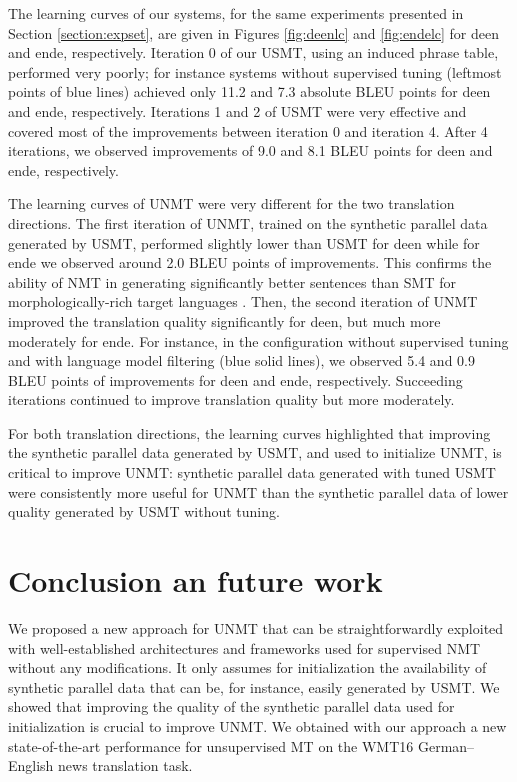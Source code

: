 \documentclass[11pt,a4paper]{article}
\begin{document}
The learning curves of our systems, for the same experiments presented in Section \ref{section:expset}, are given in Figures \ref{fig:deenlc} and \ref{fig:endelc} for deen and ende, respectively.
Iteration 0 of our USMT, using an induced phrase table, performed very poorly; for instance systems without supervised tuning (leftmost points of blue lines) achieved only 11.2 and 7.3 absolute BLEU points for deen and ende, respectively.  Iterations 1 and 2 of USMT were very effective and covered most of the improvements between iteration 0 and iteration 4. After 4 iterations, we observed improvements of 9.0 and 8.1 BLEU points for deen and ende, respectively.

The learning curves of UNMT were very different for the two translation directions.
The first iteration of UNMT, trained on the synthetic parallel data generated by USMT, performed slightly lower than USMT for deen while for ende we observed around 2.0 BLEU points of improvements. This confirms the ability of NMT in generating significantly better sentences than SMT for morphologically-rich target languages \citep{bentivogli-EtAl:2016:EMNLP2016}. Then, the second iteration of UNMT improved the translation quality significantly for deen, but much more moderately for ende. For instance, in the configuration without supervised tuning and with language model filtering (blue solid lines), we observed 5.4 and 0.9 BLEU points of improvements for deen and ende, respectively. Succeeding iterations continued to improve translation quality but more moderately.

For both translation directions, the learning curves highlighted that improving the synthetic parallel data generated by USMT, and used to initialize UNMT, is critical to improve UNMT: synthetic parallel data generated with tuned USMT were consistently more useful for UNMT than the synthetic parallel data of lower quality generated by USMT without tuning.



\section{Conclusion an future work}
We proposed a new approach for UNMT that can be straightforwardly exploited with well-established architectures and frameworks used for supervised NMT without any modifications. It only assumes for initialization the availability of synthetic parallel data that can be, for instance, easily generated by USMT. We showed that improving the quality of the synthetic parallel data used for initialization is crucial to improve UNMT. We obtained with our approach a new state-of-the-art performance for unsupervised MT on the WMT16 German--English news translation task.
\end{document}
